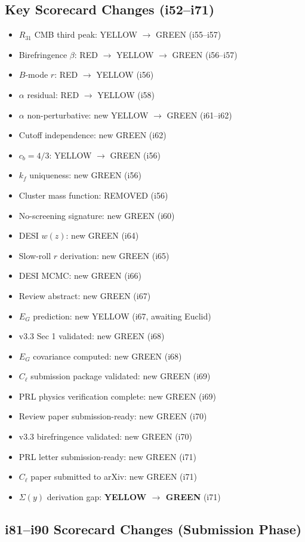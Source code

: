 \documentclass[11pt,a4paper]{article}
\begin{document}
\subsection{Key Scorecard Changes (i52--i71)}
\begin{itemize}[nosep]
\item $R_{31}$ CMB third peak: YELLOW $\to$ GREEN (i55--i57)
\item Birefringence $\beta$: RED $\to$ YELLOW $\to$ GREEN (i56--i57)
\item $B$-mode $r$: RED $\to$ YELLOW (i56)
\item $\alpha$ residual: RED $\to$ YELLOW (i58)
\item $\alpha$ non-perturbative: new YELLOW $\to$ GREEN (i61--i62)
\item Cutoff independence: new GREEN (i62)
\item $c_b = 4/3$: YELLOW $\to$ GREEN (i56)
\item $k_f$ uniqueness: new GREEN (i56)
\item Cluster mass function: REMOVED (i56)
\item No-screening signature: new GREEN (i60)
\item DESI $w(z)$: new GREEN (i64)
\item Slow-roll $r$ derivation: new GREEN (i65)
\item DESI MCMC: new GREEN (i66)
\item Review abstract: new GREEN (i67)
\item $E_G$ prediction: new YELLOW (i67, awaiting Euclid)
\item v3.3 Sec 1 validated: new GREEN (i68)
\item $E_G$ covariance computed: new GREEN (i68)
\item $C_\ell$ submission package validated: new GREEN (i69)
\item PRL physics verification complete: new GREEN (i69)
\item Review paper submission-ready: new GREEN (i70)
\item v3.3 birefringence validated: new GREEN (i70)
\item PRL letter submission-ready: new GREEN (i71)
\item $C_\ell$ paper submitted to arXiv: new GREEN (i71)
\item $\Sigma(y)$ derivation gap: \textbf{YELLOW $\to$ GREEN} (i71)
\end{itemize}

\subsection{i81--i90 Scorecard Changes (Submission Phase)}
\end{document}
